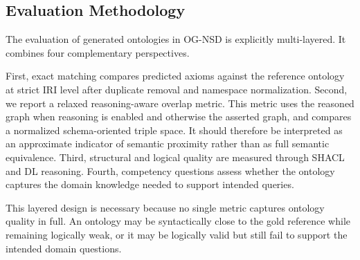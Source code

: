 \subsection{Evaluation Methodology}
The evaluation of generated ontologies in OG-NSD is explicitly multi-layered. It combines four complementary perspectives.

First, exact matching compares predicted axioms against the reference ontology at strict IRI level after duplicate removal and namespace normalization. Second, we report a relaxed reasoning-aware overlap metric. This metric uses the reasoned graph when reasoning is enabled and otherwise the asserted graph, and compares a normalized schema-oriented triple space. It should therefore be interpreted as an approximate indicator of semantic proximity rather than as full semantic equivalence. Third, structural and logical quality are measured through SHACL and DL reasoning. Fourth, competency questions assess whether the ontology captures the domain knowledge needed to support intended queries.

This layered design is necessary because no single metric captures ontology quality in full. An ontology may be syntactically close to the gold reference while remaining logically weak, or it may be logically valid but still fail to support the intended domain questions.
